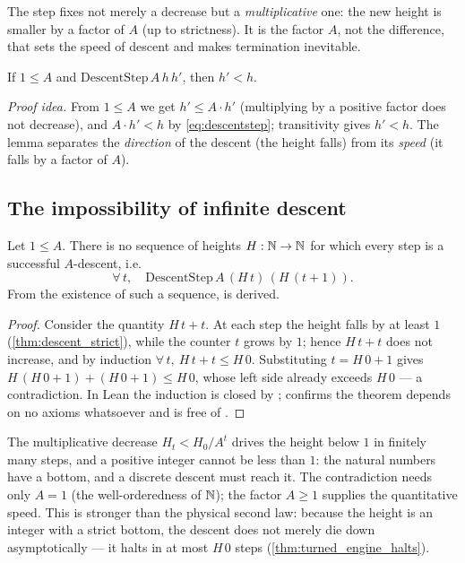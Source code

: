 The step fixes not merely a decrease but a \emph{multiplicative} one: the new height is smaller by
a factor of $A$ (up to strictness). It is the factor $A$, not the difference, that sets the speed
of descent and makes termination inevitable.

\begin{lemma}\label{thm:descent_strict}
\green{}\; If $1\le A$ and $\mathrm{DescentStep}\,A\,h\,h'$, then $h'<h$. 
\end{lemma}

\emph{Proof idea.} From $1\le A$ we get $h'\le A\cdot h'$ (multiplying by a positive factor does
not decrease), and $A\cdot h'<h$ by \cref{eq:descentstep}; transitivity gives $h'<h$. The lemma
separates the \emph{direction} of the descent (the height falls) from its \emph{speed} (it falls by
a factor of $A$).

\subsection{The impossibility of infinite descent}

\begin{theorem}\label{thm:no_infinite_descent}
\green{}\; Let $1\le A$. There is no sequence of heights $H:\mathbb{N}\to\mathbb{N}$ for which every step is a
successful $A$-descent, i.e.
\begin{equation}\label{eq:perpetualheights}
  \forall\, t,\quad \mathrm{DescentStep}\,A\,(H\,t)\,(H\,(t+1)).
\end{equation}
From the existence of such a sequence,  is derived. 
\end{theorem}

\begin{proof}
Consider the quantity $H\,t+t$. At each step the height falls by at least $1$ (\cref{thm:descent_strict}),
while the counter $t$ grows by $1$; hence $H\,t+t$ does not increase, and by induction
$\forall\,t,\ H\,t+t\le H\,0$. Substituting $t=H\,0+1$ gives
$H\,(H\,0+1)+(H\,0+1)\le H\,0$, whose left side already exceeds $H\,0$ --- a contradiction. In Lean
the induction is closed by ;  confirms the theorem depends on no
axioms whatsoever and is free of .
\end{proof}

The multiplicative decrease $H_t<H_0/A^{t}$ drives the height below $1$ in finitely many steps, and
a positive integer cannot be less than $1$: the natural numbers have a bottom, and a discrete
descent must reach it. The contradiction needs only $A=1$ (the well-orderedness of $\mathbb{N}$); the
factor $A\ge 1$ supplies the quantitative speed. This is stronger than the physical second law:
because the height is an integer with a strict bottom, the descent does not merely die down
asymptotically --- it halts in at most $H\,0$ steps (\cref{thm:turned_engine_halts}).

